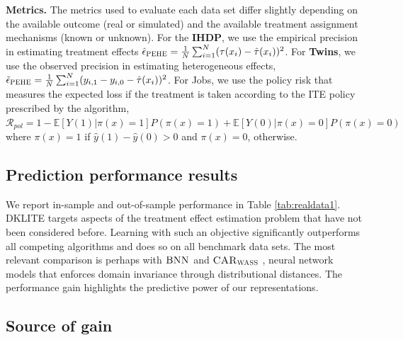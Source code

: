 \documentclass[twoside]{article}
\begin{document}
\textbf{Metrics.} The metrics used to evaluate each data set differ slightly depending on the available outcome (real or simulated) and the available treatment assignment mechanisms (known or unknown). For the \textbf{IHDP}, we use the empirical precision in estimating treatment effects $\hat{\epsilon}_{\textsc{PEHE}}=\frac{1}{N}\sum_{i=1}^{N}(\tau(x_i)-\hat{\tau}(x_i))^2$. For \textbf{Twins}, we use the observed precision in estimating heterogeneous effects, $\tilde{\epsilon}_{\textsc{PEHE}}=\frac{1}{N}\sum_{i=1}^{N}(y_{i,1}-y_{i,0}-\hat{\tau}(x_i))^2$. For Jobs, we use the policy risk that measures the expected loss if the treatment is taken according to the ITE policy prescribed by the algorithm, $\mathcal R_{pol} = 1-\mathbb E[Y(1)|\pi(x) = 1]P(\pi(x) = 1)+\mathbb E[Y(0)|\pi(x) = 0]P(\pi(x) = 0)$ where $\pi(x) = 1$ if $\hat y(1)-\hat y(0) > 0$ and $\pi(x) = 0$, otherwise.



\subsection{Prediction performance results}
We report in-sample and out-of-sample performance in Table \ref{tab:realdata1}. DKLITE targets aspects of the treatment effect estimation problem that have not been considered before. Learning with such an objective significantly outperforms all competing algorithms and does so on all benchmark data sets. The most relevant comparison is perhaps with $\textsc{BNN}$ \cite{johansson2016learning} and $\textsc{CAR}_{\textsc{WASS}}$ \cite{shalit2017estimating}, neural network models that enforces domain invariance through distributional distances. The performance gain highlights the predictive power of our representations.

\subsection{Source of gain}

\end{document}
